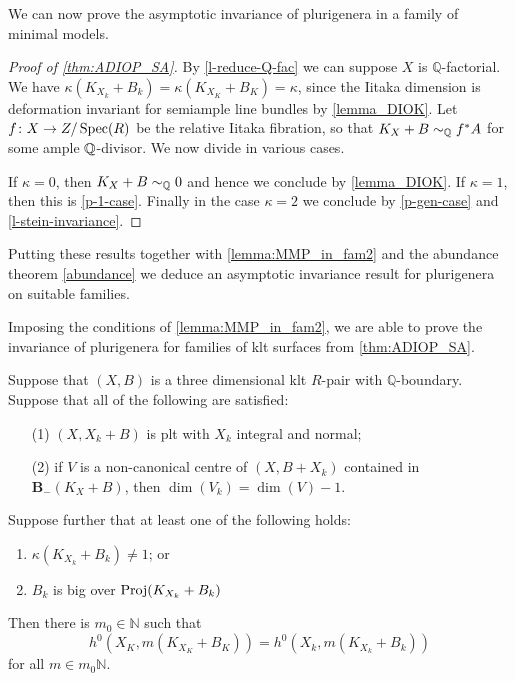 	
	We can now prove the asymptotic invariance of plurigenera in a family of minimal models.
	
	\begin{proof}[Proof of \autoref{thm:ADIOP_SA}]
		By \autoref{l-reduce-Q-fac} we can suppose $X$ is $\mathbb{Q}$-factorial.
		We have $\kappa(K_{X_k}+B_k)=\kappa(K_{X_K}+B_K)=\kappa$, since the Iitaka dimension is deformation invariant for semiample line bundles by \autoref{lemma_DIOK}. Let $f \colon X\to Z/\operatorname{Spec} (R)$ be the relative Iitaka fibration, so that $K_X+B\sim_{\mathbb{Q}}f^\ast A$ for some ample $\mathbb{Q}$-divisor. 
		We now divide in various cases.
		
		If $\kappa=0$, then $K_X+B\sim_{\mathbb{Q}}0$ and hence we conclude by \autoref{lemma_DIOK}.
		If $\kappa=1$, then this is \autoref{p-1-case}. 
		Finally in the case $\kappa=2$ we conclude by \autoref{p-gen-case} and \autoref{l-stein-invariance}. 	
	\end{proof}
	
	
	Putting these results together with \autoref{lemma:MMP_in_fam2} and the abundance theorem \autoref{abundance} we deduce an asymptotic invariance result for plurigenera on suitable families. 
	

	Imposing the conditions of \autoref{lemma:MMP_in_fam2}, we are able to prove the invariance of plurigenera for families of klt surfaces from \autoref{thm:ADIOP_SA}.
	
	\begin{theorem}\label{thm:ADIOP_final2}
		Suppose that $(X,B)$ is a three dimensional klt $R$-pair with $\mathbb{Q}$-boundary.
		Suppose that all of the following are satisfied:
		\begin{enumerate}
			\item[(1)] $(X, X_{k}+B)$ is plt with $X_k$ integral and normal;
			\item[(2)] if $V$ is a non-canonical centre of $(X,B+X_k)$ contained in ${\mathbf{B}_{-}(K_{X}+B)}$, then $\dim (V_{k})=\dim (V) -1$.
		\end{enumerate}
		Suppose further that at least one of the following holds:
		\begin{enumerate}
			\item $\kappa(K_{X_{k}}+B_{k}) \neq 1$; or
			\item $B_{k}$ is big over $\textup{Proj}(K_{X_{k}}+B_{k})$
		\end{enumerate}	
		Then there is $m_{0} \in \mathbb{N}$ such that 
		$$h^{0}(X_{K},m(K_{X_{K}}+B_{K}))=h^{0}(X_{k},m(K_{X_{k}}+B_{k}))$$
		for all $m \in m_{0}\mathbb{N}$.
		
	\end{theorem}
	
